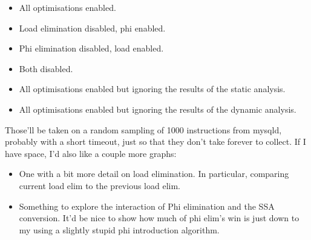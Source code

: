 \begin{itemize}
  \begin{itemize}
  \item All optimisations enabled.
  \item Load elimination disabled, phi enabled.
  \item Phi elimination disabled, load enabled.
  \item Both disabled.
  \item All optimisations enabled but ignoring the results of the
    static analysis.
  \item All optimisations enabled but ignoring the results of the
    dynamic analysis.
  \end{itemize}

  Those'll be taken on a random sampling of 1000 instructions from
  mysqld, probably with a short timeout, just so that they don't take
  forever to collect.  If I have space, I'd also like a couple more
  graphs:

  \begin{itemize}
  \item One with a bit more detail on load elimination.  In
    particular, comparing current load elim to the previous load elim.
  \item Something to explore the interaction of Phi elimination and
    the SSA conversion.  It'd be nice to show how much of phi elim's
    win is just down to my using a slightly stupid phi introduction
    algorithm.
  \end{itemize}
\end{itemize}
